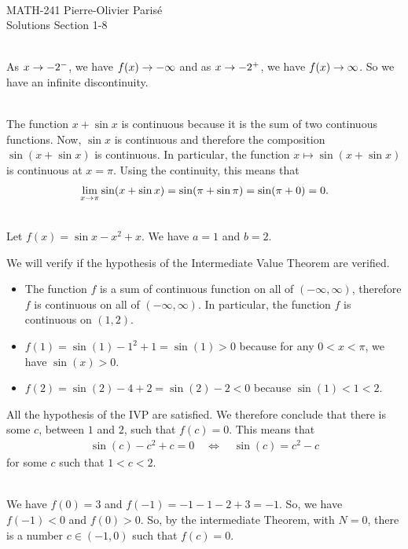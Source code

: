 


	\noindent \hrulefill \\
	MATH-241 \hfill Pierre-Olivier Paris{\'e}\\
	Solutions Section 1-8 \hfill \semester \\\vspace*{-1cm}
	
	\noindent\hrulefill
	
	\spc
	
	\\
	As $x \rightarrow -2^-$, we have $f(x) \rightarrow -\infty$ and as $x \rightarrow -2^+$, we have $f(x) \rightarrow \infty$. So we have an infinite discontinuity. 
	
	\spc
	
	\\
	The function $x + \sin x$ is continuous because it is the sum of two continuous functions. Now, $\sin x$ is continuous and therefore the composition $\sin (x + \sin x )$ is continuous. In particular, the function $x \mapsto \sin (x + \sin x)$ is continuous at $x = \pi$. Using the continuity, this means that
		\begin{align*}
		\lim_{x \rightarrow \pi} \sin (x + \sin x ) = \sin (\pi + \sin \pi ) = \sin (\pi + 0) = 0 .
		\end{align*}
		
	\spc
	
	\\
	Let $f(x) = \sin x - x^2 + x$. We have $a = 1$ and $b = 2$. 
	
	We will verify if the hypothesis of the Intermediate Value Theorem are verified. 
		\begin{itemize}
		\item The function $f$ is a sum of continuous function on all of $(-\infty , \infty )$, therefore $f$ is continuous on all of $(-\infty , \infty )$. In particular, the function $f$ is continuous on $(1, 2)$.
		\item $f(1) = \sin (1) - 1^2 + 1 = \sin (1) > 0$ because for any $0 < x < \pi$, we have $\sin (x ) > 0$.
		\item $f(2) = \sin (2) - 4 + 2 = \sin (2) - 2 < 0$ because $\sin (1) < 1 < 2$.
		\end{itemize}
	All the hypothesis of the IVP are satisfied. We therefore conclude that there is some $c$, between $1$ and $2$, such that $f(c) = 0$. This means that
		\begin{align*}
		\sin (c) - c^2 + c = 0 \quad \iff \quad \sin (c) = c^2 - c
		\end{align*}
	for some $c$ such that $1 < c < 2$. 
	
	\spc
	
	\\
	We have $f(0) = 3$ and $f(-1) = -1 - 1 - 2 + 3 = -1$. So, we have $f(-1) < 0$ and $f(0) > 0$. So, by the intermediate Theorem, with $N = 0$, there is a number $c \in (-1, 0)$ such that $f(c) = 0$.
	
	

	
	
	
	